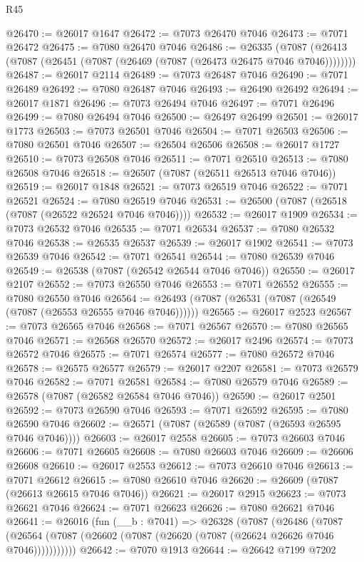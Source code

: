 \begin{lexlean}{R45}
\begin{coremodule}
{@26470 := @26017 @1647
@26472 := @7073 @26470 @7046
@26473 := @7071 @26472
@26475 := @7080 @26470 @7046
@26486 := @26335
    (@7087 (@26413 (@7087 (@26451 (@7087 (@26469 (@7087 (@26473 @26475 @7046 @7046))))))))
@26487 := @26017 @2114
@26489 := @7073 @26487 @7046
@26490 := @7071 @26489
@26492 := @7080 @26487 @7046
@26493 := @26490 @26492
@26494 := @26017 @1871
@26496 := @7073 @26494 @7046
@26497 := @7071 @26496
@26499 := @7080 @26494 @7046
@26500 := @26497 @26499
@26501 := @26017 @1773
@26503 := @7073 @26501 @7046
@26504 := @7071 @26503
@26506 := @7080 @26501 @7046
@26507 := @26504 @26506
@26508 := @26017 @1727
@26510 := @7073 @26508 @7046
@26511 := @7071 @26510
@26513 := @7080 @26508 @7046
@26518 := @26507 (@7087 (@26511 @26513 @7046 @7046))
@26519 := @26017 @1848
@26521 := @7073 @26519 @7046
@26522 := @7071 @26521
@26524 := @7080 @26519 @7046
@26531 := @26500 (@7087 (@26518 (@7087 (@26522 @26524 @7046 @7046))))
@26532 := @26017 @1909
@26534 := @7073 @26532 @7046
@26535 := @7071 @26534
@26537 := @7080 @26532 @7046
@26538 := @26535 @26537
@26539 := @26017 @1902
@26541 := @7073 @26539 @7046
@26542 := @7071 @26541
@26544 := @7080 @26539 @7046
@26549 := @26538 (@7087 (@26542 @26544 @7046 @7046))
@26550 := @26017 @2107
@26552 := @7073 @26550 @7046
@26553 := @7071 @26552
@26555 := @7080 @26550 @7046
@26564 := @26493 (@7087 (@26531 (@7087 (@26549 (@7087 (@26553 @26555 @7046 @7046))))))
@26565 := @26017 @2523
@26567 := @7073 @26565 @7046
@26568 := @7071 @26567
@26570 := @7080 @26565 @7046
@26571 := @26568 @26570
@26572 := @26017 @2496
@26574 := @7073 @26572 @7046
@26575 := @7071 @26574
@26577 := @7080 @26572 @7046
@26578 := @26575 @26577
@26579 := @26017 @2207
@26581 := @7073 @26579 @7046
@26582 := @7071 @26581
@26584 := @7080 @26579 @7046
@26589 := @26578 (@7087 (@26582 @26584 @7046 @7046))
@26590 := @26017 @2501
@26592 := @7073 @26590 @7046
@26593 := @7071 @26592
@26595 := @7080 @26590 @7046
@26602 := @26571 (@7087 (@26589 (@7087 (@26593 @26595 @7046 @7046))))
@26603 := @26017 @2558
@26605 := @7073 @26603 @7046
@26606 := @7071 @26605
@26608 := @7080 @26603 @7046
@26609 := @26606 @26608
@26610 := @26017 @2553
@26612 := @7073 @26610 @7046
@26613 := @7071 @26612
@26615 := @7080 @26610 @7046
@26620 := @26609 (@7087 (@26613 @26615 @7046 @7046))
@26621 := @26017 @2915
@26623 := @7073 @26621 @7046
@26624 := @7071 @26623
@26626 := @7080 @26621 @7046
@26641 := @26016
    (fun (__b : @7041) =>
    @26328
      (@7087
        (@26486
          (@7087 (@26564 (@7087 (@26602 (@7087 (@26620 (@7087 (@26624 @26626 @7046 @7046)))))))))))
@26642 := @7070 @1913
@26644 := @26642 @7199 @7202
}
\end{coremodule}
\end{lexlean}
